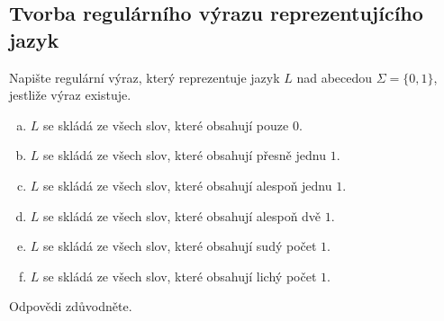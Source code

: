 \subsection{Tvorba regulárního výrazu reprezentujícího jazyk}
Napište regulární výraz, který reprezentuje jazyk $L$ nad abecedou $\Sigma = \{0,1\}$, jestliže výraz existuje.
\begin{enumerate}[a), noitemsep]
    \item $L$ se skládá ze všech slov, které obsahují pouze $0$.
    \item $L$ se skládá ze všech slov, které obsahují přesně jednu $1$.
    \item $L$ se skládá ze všech slov, které obsahují alespoň jednu $1$.
    \item $L$ se skládá ze všech slov, které obsahují alespoň dvě $1$.
    \item $L$ se skládá ze všech slov, které obsahují sudý počet $1$.
    \item $L$ se skládá ze všech slov, které obsahují lichý počet $1$.
\end{enumerate}
Odpovědi zdůvodněte.

